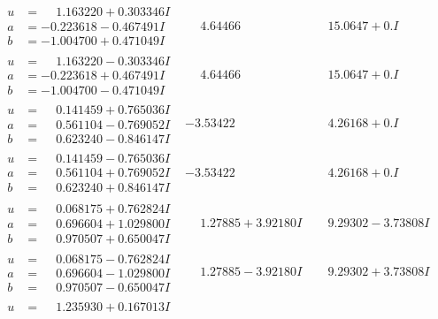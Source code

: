 \documentclass[1p]{elsarticle_modified}
\theoremstyle{definition}
\begin{document}
$$\begin{array}{c|c|c}
\begin{aligned}
u &= \phantom{-}1.163220 + 0.303346 I \\
a &= -0.223618 - 0.467491 I \\
b &= -1.004700 + 0.471049 I\end{aligned}
 & \phantom{-}4.64466\phantom{ +0.000000I} & \phantom{-}15.0647 + 0. I\phantom{ +0.000000I} \\ \hline\begin{aligned}
u &= \phantom{-}1.163220 - 0.303346 I \\
a &= -0.223618 + 0.467491 I \\
b &= -1.004700 - 0.471049 I\end{aligned}
 & \phantom{-}4.64466\phantom{ +0.000000I} & \phantom{-}15.0647 + 0. I\phantom{ +0.000000I} \\ \hline\begin{aligned}
u &= \phantom{-}0.141459 + 0.765036 I \\
a &= \phantom{-}0.561104 - 0.769052 I \\
b &= \phantom{-}0.623240 - 0.846147 I\end{aligned}
 & -3.53422\phantom{ +0.000000I} & \phantom{-}4.26168 + 0. I\phantom{ +0.000000I} \\ \hline\begin{aligned}
u &= \phantom{-}0.141459 - 0.765036 I \\
a &= \phantom{-}0.561104 + 0.769052 I \\
b &= \phantom{-}0.623240 + 0.846147 I\end{aligned}
 & -3.53422\phantom{ +0.000000I} & \phantom{-}4.26168 + 0. I\phantom{ +0.000000I} \\ \hline\begin{aligned}
u &= \phantom{-}0.068175 + 0.762824 I \\
a &= \phantom{-}0.696604 + 1.029800 I \\
b &= \phantom{-}0.970507 + 0.650047 I\end{aligned}
 & \phantom{-}1.27885 + 3.92180 I & \phantom{-}9.29302 - 3.73808 I \\ \hline\begin{aligned}
u &= \phantom{-}0.068175 - 0.762824 I \\
a &= \phantom{-}0.696604 - 1.029800 I \\
b &= \phantom{-}0.970507 - 0.650047 I\end{aligned}
 & \phantom{-}1.27885 - 3.92180 I & \phantom{-}9.29302 + 3.73808 I \\ \hline\begin{aligned}
u &= \phantom{-}1.235930 + 0.167013 I \\

\end{aligned}
\end{array}$$
\end{document}
